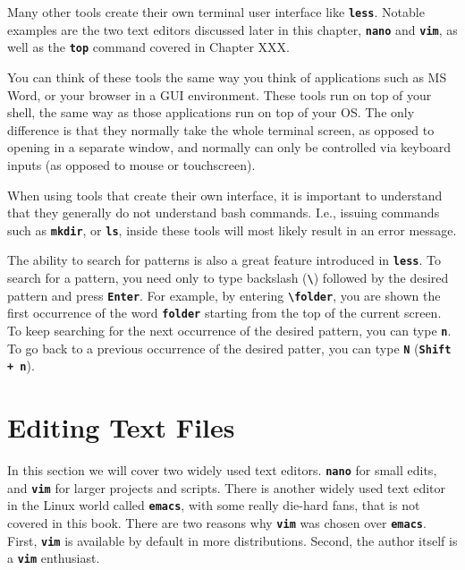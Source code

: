 \begin{my_box}
Many other tools create their own terminal user interface like \textbf{\texttt{less}}. Notable examples are the two text editors discussed later in this chapter, \textbf{\texttt{nano}} and \textbf{\texttt{vim}}, as well as the \textbf{\texttt{top}} command covered in Chapter XXX.

You can think of these tools the same way you think of applications such as MS Word, or your browser in a \acs{GUI} environment. These tools run on top of your shell, the same way as those applications run on top of your \acs{OS}. The only difference is that they normally take the whole terminal screen, as opposed to opening in a separate window, and normally can only be controlled via keyboard inputs (as opposed to mouse or touchscreen).

When using tools that create their own interface, it is important to understand that they generally do not understand bash commands. I.e., issuing commands such as \textbf{\texttt{mkdir}}, or \textbf{\texttt{ls}}, inside these tools will most likely result in an error message.
\end{my_box}


The ability to search for patterns is also a great feature introduced in \textbf{\texttt{less}}. To search for a pattern, you need only to type backslash (\textbf{\texttt{\textbackslash}}) followed by the desired pattern and press \textbf{\texttt{Enter}}. For example, by entering \textbf{\texttt{\textbackslash folder}}, you are shown the first occurrence of the word \textbf{\texttt{folder}} starting from the top of the current screen. To keep searching for the next occurrence of the desired pattern, you can type \textbf{\texttt{n}}. To go back to a previous occurrence of the desired patter, you can type \textbf{\texttt{N}} (\textbf{\texttt{Shift + n}}).

\section{Editing Text Files}

In this section we will cover two widely used text editors. \textbf{\texttt{nano}} for small edits, and \textbf{\texttt{vim}} for larger projects and scripts. There is another widely used text editor in the Linux world called \textbf{\texttt{emacs}}, with some really die-hard fans, that is not covered in this book. There are two reasons why \textbf{\texttt{vim}} was chosen over \textbf{\texttt{emacs}}. First, \textbf{\texttt{vim}} is available by default in more distributions. Second, the author itself is a \textbf{\texttt{vim}} enthusiast.

